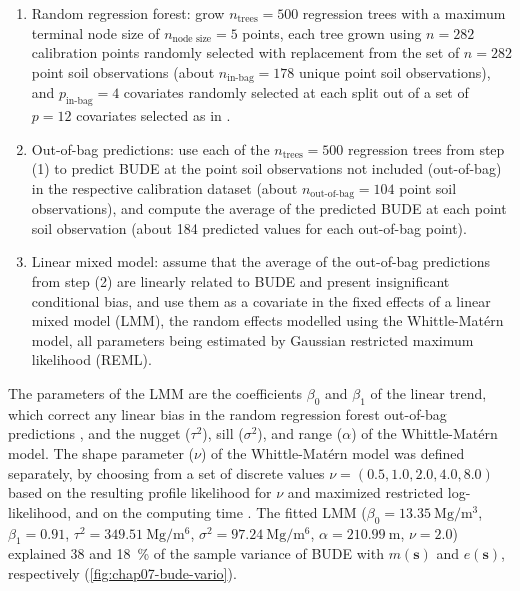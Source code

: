 \begin{enumerate}
 \item Random regression forest: grow $n_{\text{trees}} = 500$ regression trees with a maximum terminal node 
 size of $n_{\text{node size}} = 5$ points, each tree grown using $n = 282$ calibration points randomly 
 selected with replacement from the set of $n = 282$ point soil observations (about $n_{\text{in-bag}} = 178$ 
 unique point soil observations), and $p_{\text{in-bag}} = 4$ covariates randomly selected at each split out 
 of a set of $p = 12$ covariates selected as in \citet{Samuel-RosaEtAl2015}.
 
 \item Out-of-bag predictions: use each of the $n_{\text{trees}} = 500$ regression trees from step (1) to 
 predict BUDE at the  point soil observations not included (out-of-bag) in the respective calibration dataset 
 (about $n_{\text{out-of-bag}} = 104$ point soil observations), and compute the average of the predicted BUDE 
 at each point soil observation (about 184 predicted values for each out-of-bag point).
 
 \item Linear mixed model: assume that the average of the out-of-bag predictions from step (2) are linearly 
 related to BUDE and present insignificant conditional bias, and use them as a covariate in the fixed effects 
 of a linear mixed model (LMM), the random effects modelled using the Whittle-Matérn model, all parameters 
 being estimated by Gaussian restricted maximum likelihood (REML).
\end{enumerate}

The parameters of the LMM are the coefficients $\beta_0$ and $\beta_1$ of the linear trend, which correct 
any linear bias in the random regression forest out-of-bag predictions \cite{LiawEtAl2002}, and the nugget 
($\tau^2$), sill ($\sigma^2$), and range ($\alpha$) of the Whittle-Matérn model. The shape parameter 
($\nu$) of the Whittle-Matérn model was defined separately, by choosing from a set of discrete values 
$\nu = (0.5, 1.0, 2.0, 4.0, 8.0)$ based on the resulting profile likelihood for $\nu$ and maximized restricted 
log-likelihood, and on the computing time \cite{Stein1999, DiggleEtAl2007}. The fitted LMM 
($\beta_0 = \SI{13.35}{\mega\gram\per\cubic\metre}$, $\beta_1 = 0.91$, 
$\tau^2 = \SI{349.51}{\mega\gram\per\metre\tothe{6}}$, $\sigma^2 = \SI{97.24}{\mega\gram\per\metre\tothe{6}}$, 
$\alpha = \SI{210.99}{\metre}$, $\nu = 2.0$) explained \num{38} and \SI{18}{\percent} of the sample variance of 
BUDE with $m(\boldsymbol{s})$ and $e(\boldsymbol{s})$, respectively (\autoref{fig:chap07-bude-vario}).

